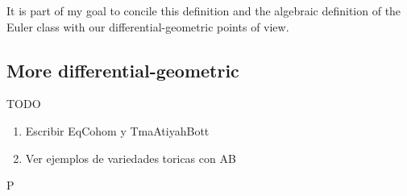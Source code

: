 \documentclass[12pt]{memoir}
\def\nextra {P}
\begin{document}
It is part of my goal to concile this definition and the algebraic definition of the Euler class with our differential-geometric points of view.

\subsection{More differential-geometric}


TODO
\begin{enumerate}
    \item Escribir EqCohom y TmaAtiyahBott
    \item Ver ejemplos de variedades toricas con AB
\end{enumerate}
\ifx\nextra\undefined
\printindex
\else\fi
\nocite{*}


\end{document}
